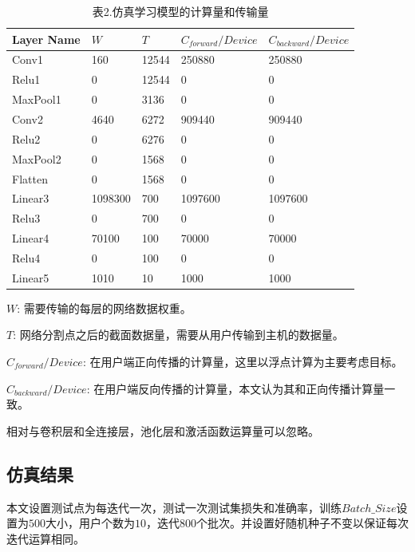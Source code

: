 \documentclass{article}
\begin{document}
\begin{table}[H]
    \caption*{表2.仿真学习模型的计算量和传输量}
    \centering
    \begin{threeparttable}
    \begin{tabular}{lllll}
    \toprule
    Layer Name & $W$ & $T$ & $C_{forward}/Device$ & $C_{backward}/Device$\\
    \midrule
    Conv1 & 160 & 12544 & 250880 & 250880 \\
    Relu1 & 0 & 12544 & 0 & 0\\
    MaxPool1 & 0 & 3136 & 0 & 0\\
    Conv2 & 4640 & 6272 & 909440 & 909440\\
    Relu2 & 0 & 6276 & 0 & 0\\
    MaxPool2 & 0 & 1568 & 0 & 0\\
    Flatten & 0 & 1568 & 0 & 0\\
    Linear3 & 1098300 & 700 & 1097600 & 1097600\\
    Relu3 & 0 & 700 & 0 & 0\\
    Linear4 & 70100 & 100 & 70000 & 70000\\
    Relu4 & 0 & 100 & 0 & 0\\
    Linear5 & 1010 & 10 & 1000 & 1000\\
    \bottomrule
    \end{tabular}
    \begin{tablenotes}[c]
        \footnotesize
        \item $W$: 需要传输的每层的网络数据权重。
        \item $T$: 网络分割点之后的截面数据量，需要从用户传输到主机的数据量。
        \item $C_{forward}/Device$: 在用户端正向传播的计算量，这里以浮点计算为主要考虑目标。
        \item $C_{backward}/Device$: 在用户端反向传播的计算量，本文认为其和正向传播计算量一致。
        \item 相对与卷积层和全连接层，池化层和激活函数运算量可以忽略。
    \end{tablenotes}
    \end{threeparttable}
    \end{table}
    
\subsection{仿真结果}
本文设置测试点为每迭代一次，测试一次测试集损失和准确率，训练$Batch\_Size$设置为$500$大小，用户个数为$10$，迭代$800$个批次。并设置好随机种子不变以保证每次迭代运算相同。
\end{document}
